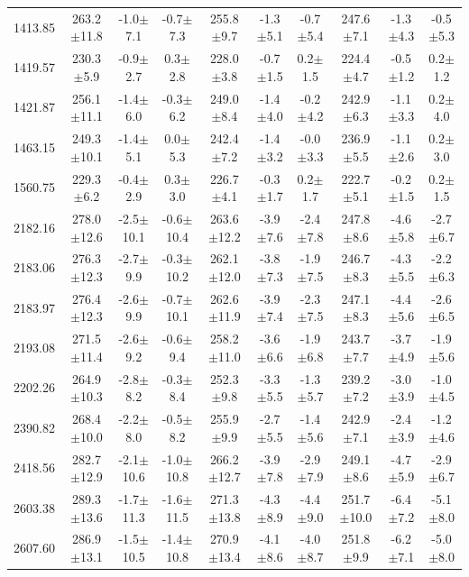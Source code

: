 \documentclass[agupp]{aguplus}              %
\begin{document}
\begin{article}
\begin{center}
\begin{table}[ht]
{\begin{tabular}{c|ccc|ccc|ccc}
1413.85 & 263.2$\pm$11.8 & -1.0$\pm$7.1 & -0.7$\pm$7.3 & 255.8$\pm$9.7 & -1.3$\pm$5.1 & -0.7$\pm$5.4 & 247.6$\pm$7.1 & -1.3$\pm$4.3 & -0.5$\pm$5.3 \\ 
1419.57 & 230.3$\pm$5.9 & -0.9$\pm$2.7 &  0.3$\pm$2.8 & 228.0$\pm$3.8 & -0.7$\pm$1.5 &  0.2$\pm$1.5 & 224.4$\pm$4.7 & -0.5$\pm$1.2 &  0.2$\pm$1.2 \\ 
1421.87 & 256.1$\pm$11.1 & -1.4$\pm$6.0 & -0.3$\pm$6.2 & 249.0$\pm$8.4 & -1.4$\pm$4.0 & -0.2$\pm$4.2 & 242.9$\pm$6.3 & -1.1$\pm$3.3 &  0.2$\pm$4.0 \\ 
1463.15 & 249.3$\pm$10.1 & -1.4$\pm$5.1 &  0.0$\pm$5.3 & 242.4$\pm$7.2 & -1.4$\pm$3.2 & -0.0$\pm$3.3 & 236.9$\pm$5.5 & -1.1$\pm$2.6 &  0.2$\pm$3.0 \\ 
1560.75 & 229.3$\pm$6.2 & -0.4$\pm$2.9 &  0.3$\pm$3.0 & 226.7$\pm$4.1 & -0.3$\pm$1.7 &  0.2$\pm$1.7 & 222.7$\pm$5.1 & -0.2$\pm$1.5 &  0.2$\pm$1.5 \\ 
\hline
2182.16 & 278.0$\pm$12.6 & -2.5$\pm$10.1 & -0.6$\pm$10.4 & 263.6$\pm$12.2 & -3.9$\pm$7.6 & -2.4$\pm$7.8 & 247.8$\pm$8.6 & -4.6$\pm$5.8 & -2.7$\pm$6.7 \\ 
2183.06 & 276.3$\pm$12.3 & -2.7$\pm$9.9 & -0.3$\pm$10.2 & 262.1$\pm$12.0 & -3.8$\pm$7.3 & -1.9$\pm$7.5 & 246.7$\pm$8.3 & -4.3$\pm$5.5 & -2.2$\pm$6.3 \\ 
2183.97 & 276.4$\pm$12.3 & -2.6$\pm$9.9 & -0.7$\pm$10.1 & 262.6$\pm$11.9 & -3.9$\pm$7.4 & -2.3$\pm$7.5 & 247.1$\pm$8.3 & -4.4$\pm$5.6 & -2.6$\pm$6.5 \\ 
2193.08 & 271.5$\pm$11.4 & -2.6$\pm$9.2 & -0.6$\pm$9.4 & 258.2$\pm$11.0 & -3.6$\pm$6.6 & -1.9$\pm$6.8 & 243.7$\pm$7.7 & -3.7$\pm$4.9 & -1.9$\pm$5.6 \\ 
2202.26 & 264.9$\pm$10.3 & -2.8$\pm$8.2 & -0.3$\pm$8.4 & 252.3$\pm$9.8 & -3.3$\pm$5.5 & -1.3$\pm$5.7 & 239.2$\pm$7.2 & -3.0$\pm$3.9 & -1.0$\pm$4.5 \\ 
2390.82 & 268.4$\pm$10.0 & -2.2$\pm$8.0 & -0.5$\pm$8.2 & 255.9$\pm$9.9 & -2.7$\pm$5.5 & -1.4$\pm$5.6 & 242.9$\pm$7.1 & -2.4$\pm$3.9 & -1.2$\pm$4.6 \\ 
\hline
2418.56 & 282.7$\pm$12.9 & -2.1$\pm$10.6 & -1.0$\pm$10.8 & 266.2$\pm$12.7 & -3.9$\pm$7.8 & -2.9$\pm$7.9 & 249.1$\pm$8.6 & -4.7$\pm$5.9 & -2.9$\pm$6.7 \\ 
2603.38 & 289.3$\pm$13.6 & -1.7$\pm$11.3 & -1.6$\pm$11.5 & 271.3$\pm$13.8 & -4.3$\pm$8.9 & -4.4$\pm$9.0 & 251.7$\pm$10.0 & -6.4$\pm$7.2 & -5.1$\pm$8.0 \\ 
2607.60 & 286.9$\pm$13.1 & -1.5$\pm$10.5 & -1.4$\pm$10.8 & 270.9$\pm$13.4 & -4.1$\pm$8.6 & -4.0$\pm$8.7 & 251.8$\pm$9.9 & -6.2$\pm$7.1 & -5.0$\pm$8.0 \\ 

\end{tabular}}
\end{table}
\end{center}
\end{article}
\end{document}
